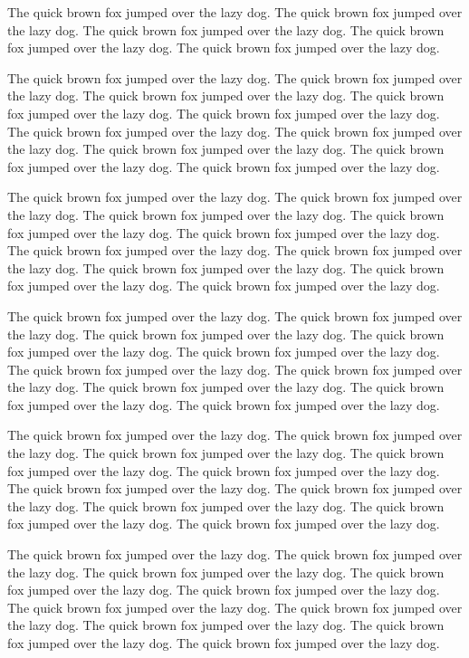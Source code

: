 \documentclass[12pt]{article}
\begin{document}
The quick brown fox jumped over the lazy dog. The quick brown fox jumped
over the lazy dog. The quick brown fox jumped over the lazy dog. The
quick brown fox jumped over the lazy dog. The quick brown fox jumped
over the lazy dog.

The quick brown fox jumped over the lazy dog. The quick brown fox jumped
over the lazy dog. The quick brown fox jumped over the lazy dog. The
quick brown fox jumped over the lazy dog. The quick brown fox jumped
over the lazy dog. The quick brown fox jumped over the lazy dog. The
quick brown fox jumped over the lazy dog. The quick brown fox jumped
over the lazy dog. The quick brown fox jumped over the lazy dog. The
quick brown fox jumped over the lazy dog.

The quick brown fox jumped over the lazy dog. The quick brown fox jumped
over the lazy dog. The quick brown fox jumped over the lazy dog. The
quick brown fox jumped over the lazy dog. The quick brown fox jumped
over the lazy dog. The quick brown fox jumped over the lazy dog. The
quick brown fox jumped over the lazy dog. The quick brown fox jumped
over the lazy dog. The quick brown fox jumped over the lazy dog. The
quick brown fox jumped over the lazy dog.

The quick brown fox jumped over the lazy dog. The quick brown fox jumped
over the lazy dog. The quick brown fox jumped over the lazy dog. The
quick brown fox jumped over the lazy dog. The quick brown fox jumped
over the lazy dog. The quick brown fox jumped over the lazy dog. The
quick brown fox jumped over the lazy dog. The quick brown fox jumped
over the lazy dog. The quick brown fox jumped over the lazy dog. The
quick brown fox jumped over the lazy dog.

The quick brown fox jumped over the lazy dog. The quick brown fox jumped
over the lazy dog. The quick brown fox jumped over the lazy dog. The
quick brown fox jumped over the lazy dog. The quick brown fox jumped
over the lazy dog. The quick brown fox jumped over the lazy dog. The
quick brown fox jumped over the lazy dog. The quick brown fox jumped
over the lazy dog. The quick brown fox jumped over the lazy dog. The
quick brown fox jumped over the lazy dog.

The quick brown fox jumped over the lazy dog. The quick brown fox jumped
over the lazy dog. The quick brown fox jumped over the lazy dog. The
quick brown fox jumped over the lazy dog. The quick brown fox jumped
over the lazy dog. The quick brown fox jumped over the lazy dog. The
quick brown fox jumped over the lazy dog. The quick brown fox jumped
over the lazy dog. The quick brown fox jumped over the lazy dog. The
quick brown fox jumped over the lazy dog.
\end{document}
